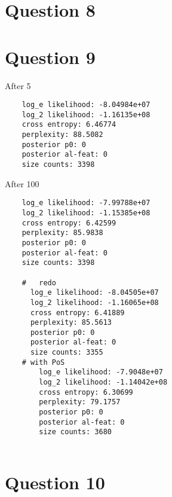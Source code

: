 \documentclass[]{article}
\begin{document}
\section{Question 8}

\section{Question 9}
After 5

\begin{verbatim}
	log_e likelihood: -8.04984e+07
	log_2 likelihood: -1.16135e+08
	cross entropy: 6.46774
	perplexity: 88.5082
	posterior p0: 0
	posterior al-feat: 0
	size counts: 3398
\end{verbatim}

After 100
\begin{verbatim}
	log_e likelihood: -7.99788e+07
	log_2 likelihood: -1.15385e+08
	cross entropy: 6.42599
	perplexity: 85.9838
	posterior p0: 0
	posterior al-feat: 0
	size counts: 3398
	
	#	redo
	  log_e likelihood: -8.04505e+07
	  log_2 likelihood: -1.16065e+08
	  cross entropy: 6.41889
	  perplexity: 85.5613
	  posterior p0: 0
	  posterior al-feat: 0
	  size counts: 3355
	# with PoS  
	    log_e likelihood: -7.9048e+07
	    log_2 likelihood: -1.14042e+08
	    cross entropy: 6.30699
	    perplexity: 79.1757
	    posterior p0: 0
	    posterior al-feat: 0
	    size counts: 3680
	    
\end{verbatim}

\section{Question 10}

{}

\end{document}
